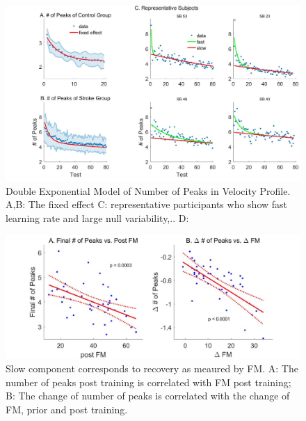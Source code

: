 \begin{figure}
	\centering
	\includegraphics[width=1\linewidth]{figures/3nopFixRan}
	\caption[Double Exponential Model]
	{Double Exponential Model of Number of Peaks in Velocity Profile. 
		A,B: The fixed effect
		C: representative participants who show fast learning rate and large null variability,..
		D: }
	\label{fig:3nopfixran}
\end{figure}

\begin{figure}
	\centering
	\includegraphics[width=1\linewidth]{figures/4slowComponentIsRecovery}
	\caption[Slow component corresponds to recovery as meaured by FM]
	{Slow component corresponds to recovery as meaured by FM. 
		A: The number of peaks post training is correlated with FM post training;
		B: The change of number of peaks is correlated with the change of FM, prior and post training.}
	\label{fig:4slowcomponentisrecovery}
\end{figure}

